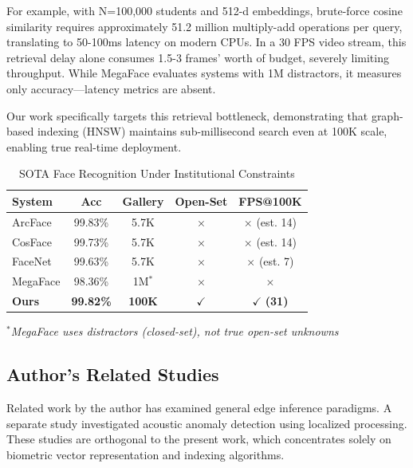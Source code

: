 \documentclass[conference]{IEEEtran}
\begin{document}
For example, with N=100,000 students and 512-d embeddings, brute-force cosine similarity requires approximately 51.2 million multiply-add operations per query, translating to 50-100ms latency on modern CPUs. In a 30 FPS video stream, this retrieval delay alone consumes 1.5-3 frames' worth of budget, severely limiting throughput. While MegaFace evaluates systems with 1M distractors, it measures only accuracy—latency metrics are absent.

Our work specifically targets this retrieval bottleneck, demonstrating that graph-based indexing (HNSW) maintains sub-millisecond search even at 100K scale, enabling true real-time deployment.

\begin{table}[htbp]
\caption{SOTA Face Recognition Under Institutional Constraints}
\begin{center}
\begin{tabular}{|l|c|c|c|c|}
\hline
\textbf{System} & \textbf{Acc} & \textbf{Gallery} & \textbf{Open-Set} & \textbf{FPS@100K} \\
\hline
ArcFace \cite{b5} & 99.83\% & 5.7K & $\times$ & $\times$ (est. 14) \\
\hline
CosFace \cite{cosface} & 99.73\% & 5.7K & $\times$ & $\times$ (est. 14) \\
\hline
FaceNet \cite{b18} & 99.63\% & 5.7K & $\times$ & $\times$ (est. 7) \\
\hline
MegaFace \cite{megaface} & 98.36\% & 1M$^*$ & $\times$ & $\times$ \\
\hline
\textbf{Ours} & \textbf{99.82\%} & \textbf{100K} & $\checkmark$ & $\checkmark$ \textbf{(31)} \\
\hline
\end{tabular}
\end{center}
\label{tab:sota_constraints}
\textit{$^*$MegaFace uses distractors (closed-set), not true open-set unknowns}
\end{table}

\subsection{Author's Related Studies}
Related work by the author has examined general edge inference paradigms. A separate study investigated acoustic anomaly detection using localized processing. These studies are orthogonal to the present work, which concentrates solely on biometric vector representation and indexing algorithms.

\end{document}
